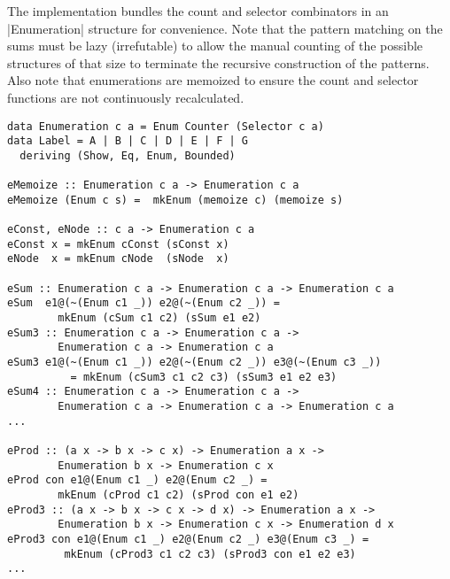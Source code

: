 The \GC implementation bundles the count and selector combinators in an |Enumeration| structure for convenience.
Note that the pattern matching on the sums must be lazy (irrefutable) to allow the
manual counting of the possible structures of that size to terminate the
recursive construction of the patterns.
Also note that enumerations are memoized to ensure the count and selector functions
are not continuously recalculated.

\begin{lstlisting}
data Enumeration c a = Enum Counter (Selector c a)
data Label = A | B | C | D | E | F | G 
  deriving (Show, Eq, Enum, Bounded)

eMemoize :: Enumeration c a -> Enumeration c a
eMemoize (Enum c s) =  mkEnum (memoize c) (memoize s)

eConst, eNode :: c a -> Enumeration c a
eConst x = mkEnum cConst (sConst x)
eNode  x = mkEnum cNode  (sNode  x)

eSum :: Enumeration c a -> Enumeration c a -> Enumeration c a
eSum  e1@(~(Enum c1 _)) e2@(~(Enum c2 _)) = 
		mkEnum (cSum c1 c2) (sSum e1 e2)
eSum3 :: Enumeration c a -> Enumeration c a -> 
		Enumeration c a -> Enumeration c a
eSum3 e1@(~(Enum c1 _)) e2@(~(Enum c2 _)) e3@(~(Enum c3 _)) 
          = mkEnum (cSum3 c1 c2 c3) (sSum3 e1 e2 e3)
eSum4 :: Enumeration c a -> Enumeration c a -> 
		Enumeration c a -> Enumeration c a -> Enumeration c a
...

eProd :: (a x -> b x -> c x) -> Enumeration a x -> 
		Enumeration b x -> Enumeration c x
eProd con e1@(Enum c1 _) e2@(Enum c2 _) = 
		mkEnum (cProd c1 c2) (sProd con e1 e2)
eProd3 :: (a x -> b x -> c x -> d x) -> Enumeration a x -> 
		Enumeration b x -> Enumeration c x -> Enumeration d x
eProd3 con e1@(Enum c1 _) e2@(Enum c2 _) e3@(Enum c3 _) = 
         mkEnum (cProd3 c1 c2 c3) (sProd3 con e1 e2 e3)
...

\end{lstlisting}




